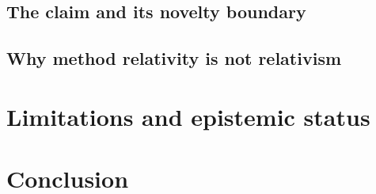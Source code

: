 \subsection{The claim and its novelty boundary}
\subsection{Why method relativity is not relativism}

\section{Limitations and epistemic status}

\section{Conclusion}




